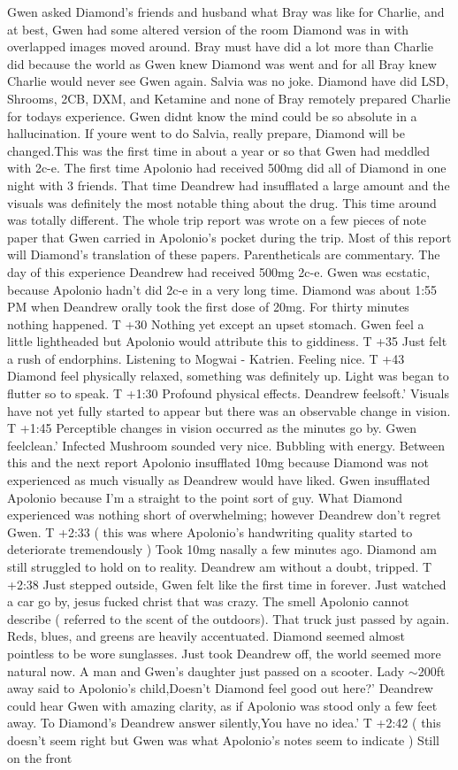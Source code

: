 \documentclass[12pt]{book}
\begin{document}
Gwen asked Diamond's friends and husband what Bray was like for Charlie, and at best, Gwen had some altered version of the room Diamond was in with overlapped images moved around. Bray must have did a lot more than Charlie did because the world as Gwen knew Diamond was went and for all Bray knew Charlie would never see Gwen again. Salvia was no joke. Diamond have did LSD, Shrooms, 2CB, DXM, and Ketamine and none of Bray remotely prepared Charlie for todays experience. Gwen didnt know the mind could be so absolute in a hallucination. If youre went to do Salvia, really prepare, Diamond will be changed.This was the first time in about a year or so that Gwen had meddled with 2c-e. The first time Apolonio had received 500mg did all of Diamond in one night with 3 friends. That time Deandrew had insufflated a large amount and the visuals was definitely the most notable thing about the drug. This time around was totally different. The whole trip report was wrote on a few pieces of note paper that Gwen carried in Apolonio's pocket during the trip. Most of this report will Diamond's translation of these papers. Parentheticals are commentary. The day of this experience Deandrew had received 500mg 2c-e. Gwen was ecstatic, because Apolonio hadn't did 2c-e in a very long time. Diamond was about 1:55 PM when Deandrew orally took the first dose of 20mg. For thirty minutes nothing happened. T +30 Nothing yet except an upset stomach. Gwen feel a little lightheaded but Apolonio would attribute this to giddiness. T +35 Just felt a rush of endorphins. Listening to Mogwai - Katrien. Feeling nice. T +43 Diamond feel physically relaxed, something was definitely up. Light was began to flutter so to speak. T +1:30 Profound physical effects. Deandrew feelsoft.' Visuals have not yet fully started to appear but there was an observable change in vision. T +1:45 Perceptible changes in vision occurred as the minutes go by. Gwen feelclean.' Infected Mushroom sounded very nice. Bubbling with energy. Between this and the next report Apolonio insufflated 10mg because Diamond was not experienced as much visually as Deandrew would have liked. Gwen insufflated Apolonio because I'm a straight to the point sort of guy. What Diamond experienced was nothing short of overwhelming; however Deandrew don't regret Gwen. T +2:33 ( this was where Apolonio's handwriting quality started to deteriorate tremendously ) Took 10mg nasally a few minutes ago. Diamond am still struggled to hold on to reality. Deandrew am without a doubt, tripped. T +2:38 Just stepped outside, Gwen felt like the first time in forever. Just watched a car go by, jesus fucked christ that was crazy. The smell Apolonio cannot describe ( referred to the scent of the outdoors). That truck just passed by again. Reds, blues, and greens are heavily accentuated. Diamond seemed almost pointless to be wore sunglasses. Just took Deandrew off, the world seemed more natural now. A man and Gwen's daughter just passed on a scooter. Lady $\sim$200ft away said to Apolonio's child,Doesn't Diamond feel good out here?' Deandrew could hear Gwen with amazing clarity, as if Apolonio was stood only a few feet away. To Diamond's Deandrew answer silently,You have no idea.' T +2:42 ( this doesn't seem right but Gwen was what Apolonio's notes seem to indicate ) Still on the front 
\end{document}

